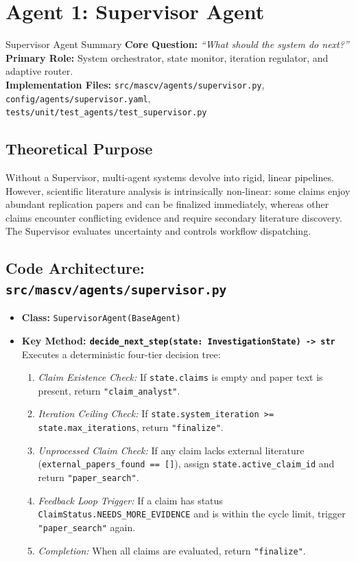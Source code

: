 \documentclass[11pt,a4paper]{article}
\begin{document}
\section{Agent 1: Supervisor Agent}

\begin{agentbox}{Supervisor Agent Summary}
\textbf{Core Question:} \textit{``What should the system do next?''}\\
\textbf{Primary Role:} System orchestrator, state monitor, iteration regulator, and adaptive router.\\
\textbf{Implementation Files:} \texttt{src/mascv/agents/supervisor.py}, \texttt{config/agents/supervisor.yaml}, \texttt{tests/unit/test\_agents/test\_supervisor.py}
\end{agentbox}

\subsection{Theoretical Purpose}
Without a Supervisor, multi-agent systems devolve into rigid, linear pipelines. However, scientific literature analysis is intrinsically non-linear: some claims enjoy abundant replication papers and can be finalized immediately, whereas other claims encounter conflicting evidence and require secondary literature discovery. The Supervisor evaluates uncertainty and controls workflow dispatching.

\subsection{Code Architecture: \texttt{src/mascv/agents/supervisor.py}}
\begin{itemize}[leftmargin=*]
    \item \textbf{Class:} \texttt{SupervisorAgent(BaseAgent)}
    \item \textbf{Key Method: \texttt{decide\_next\_step(state: InvestigationState) -> str}}
    Executes a deterministic four-tier decision tree:
    \begin{enumerate}
        \item \textit{Claim Existence Check:} If \texttt{state.claims} is empty and paper text is present, return \texttt{"claim\_analyst"}.
        \item \textit{Iteration Ceiling Check:} If \texttt{state.system\_iteration >= state.max\_iterations}, return \texttt{"finalize"}.
        \item \textit{Unprocessed Claim Check:} If any claim lacks external literature (\texttt{external\_papers\_found == []}), assign \texttt{state.active\_claim\_id} and return \texttt{"paper\_search"}.
        \item \textit{Feedback Loop Trigger:} If a claim has status \texttt{ClaimStatus.NEEDS\_MORE\_EVIDENCE} and is within the cycle limit, trigger \texttt{"paper\_search"} again.
        \item \textit{Completion:} When all claims are evaluated, return \texttt{"finalize"}.
    \end{enumerate}
\end{itemize}
\end{document}
